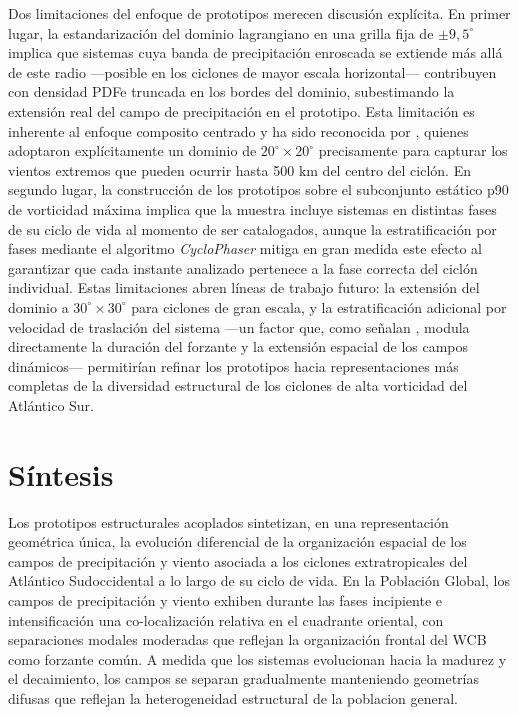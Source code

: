 
Dos limitaciones del enfoque de prototipos merecen discusión explícita. En primer lugar, la estandarización del dominio lagrangiano en una grilla fija de $\pm 9{,}5^{\circ}$ implica que sistemas cuya banda de precipitación enroscada se extiende más allá de este radio —posible en los ciclones de mayor escala horizontal— contribuyen con densidad PDFe truncada en los bordes del dominio, subestimando la extensión real del campo de precipitación en el prototipo. Esta limitación es inherente al enfoque composito centrado y ha sido reconocida por \citet{cardoso2022synoptic}, quienes adoptaron explícitamente un dominio de $20^{\circ} \times 20^{\circ}$ precisamente para capturar los vientos extremos que pueden ocurrir hasta 500 km del centro del ciclón. En segundo lugar, la construcción de los prototipos sobre el subconjunto estático p90 de vorticidad máxima implica que la muestra incluye sistemas en distintas fases de su ciclo de vida al momento de ser catalogados, aunque la estratificación por fases mediante el algoritmo \textit{CycloPhaser} \citep{deSouza2025CycloPhaser} mitiga en gran medida este efecto al garantizar que cada instante analizado pertenece a la fase correcta del ciclón individual. Estas limitaciones abren líneas de trabajo futuro: la extensión del dominio a $30^{\circ} \times 30^{\circ}$ para ciclones de gran escala, y la estratificación adicional por velocidad de traslación del sistema —un factor que, como señalan \citet{gramcianinov2023impact}, modula directamente la duración del forzante y la extensión espacial de los campos dinámicos— permitirían refinar los prototipos hacia representaciones más completas de la diversidad estructural de los ciclones de alta vorticidad del Atlántico Sur.

\section{Síntesis}\label{sec:sintesis_prototipos}

Los prototipos estructurales acoplados sintetizan, en una representación geométrica única, la evolución diferencial de la organización espacial de los campos de precipitación y viento asociada a los ciclones extratropicales del Atlántico Sudoccidental a lo largo de su ciclo de vida. En la Población Global, los campos de precipitación y viento exhiben durante las fases incipiente e intensificación una co-localización relativa en el cuadrante oriental, con separaciones modales moderadas que reflejan la organización frontal del WCB como forzante común. A medida que los sistemas evolucionan hacia la madurez y el decaimiento, los campos se separan gradualmente manteniendo geometrías difusas que reflejan la heterogeneidad estructural de la poblacion general.


